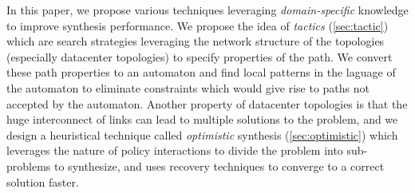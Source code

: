 In this paper, we propose various techniques leveraging
\emph{domain-specific} knowledge to improve synthesis performance. We
propose the idea of \emph{tactics} (\cref{sec:tactic}) which are
search strategies leveraging the network structure of the topologies
(especially datacenter topologies) to specify properties of the
path. We convert these path properties to an automaton and find local
patterns in the laguage of the automaton to eliminate constraints
which would give rise to paths not accepted by the automaton. Another
property of datacenter topologies is that the huge interconnect of
links can lead to multiple solutions to the problem, and we design a
heuristical technique called \emph{optimistic} synthesis
(\cref{sec:optimistic}) which leverages the nature of policy
interactions to divide the problem into sub-problems to synthesize,
and uses recovery techniques to converge to a correct solution faster.
